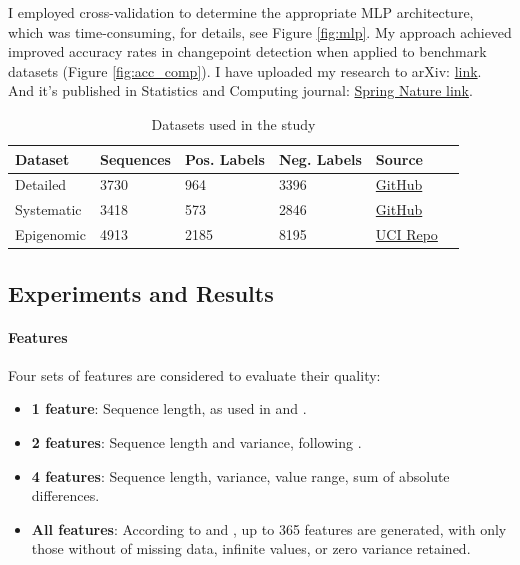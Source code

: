 \documentclass[12pt]{article}
\begin{document}
I employed cross-validation to determine the appropriate MLP architecture, which was time-consuming, for details, see Figure \ref{fig:mlp}.
My approach achieved improved accuracy rates in changepoint detection when applied to benchmark datasets (Figure \ref{fig:acc_comp}).
I have uploaded my research to arXiv: \href{https://arxiv.org/abs/2408.00856}{link}.
And it's published in Statistics and Computing journal: \href{https://link.springer.com/article/10.1007/s11222-025-10680-0}{Spring Nature link}.

\begin{table}[!t]
\centering
\begin{tabular}{llllll}
\hline
\textbf{Dataset} & \textbf{Sequences} & \textbf{Pos. Labels} & \textbf{Neg. Labels} & \textbf{Source} \\ \hline
{Detailed}       & 3730                    & 964                  & 3396                 & \href{https://github.com/tdhock/neuroblastoma-data/tree/master/data/detailed}{GitHub} \\ \hline
{Systematic}     & 3418                    & 573                  & 2846                 & \href{https://github.com/tdhock/neuroblastoma-data/tree/master/data/systematic}{GitHub}  \\ \hline
{Epigenomic}     & 4913                    & 2185                 & 8195                 & \href{https://archive.ics.uci.edu/ml/machine-learning-databases/00439/peak-detection-data.tar.xz}{UCI Repo} \\ \hline
\end{tabular}
\label{tab:datasets}
\caption{Datasets used in the study}
\end{table}



\subsection{Experiments and Results}

\paragraph{Features} Four sets of features are considered to evaluate their quality:
\begin{itemize} 
\item \textbf{1 feature}: Sequence length, as used in \cite{lopart} and \cite{bic}. 
\item \textbf{2 features}: Sequence length and variance, following \cite{rigaill:13}. 
\item \textbf{4 features}: Sequence length, variance, value range, sum of absolute differences. 
\item \textbf{All features}: According to \cite{rigaill:13} and \cite{mmit}, up to 365 features are generated, with only those without of missing data, infinite values, or zero variance retained.
\end{itemize}
\end{document}
